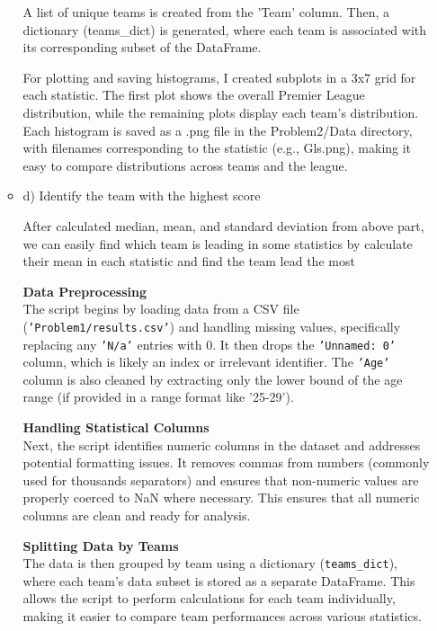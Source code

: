 \documentclass[a4paper,12pt]{article}
\begin{document}
\begin{itemize}[label= {*}, leftmargin= 1cm]
\begin{itemize}[label= {}, leftmargin= 1cm]
        A list of unique teams is created from the 'Team' column. Then, a dictionary (teams\_dict) is generated, where each team is associated with its corresponding subset of the DataFrame.

        For plotting and saving histograms, I created subplots in a 3x7 grid for each statistic. The first plot shows the overall Premier League distribution, while the remaining plots display each team's distribution. Each histogram is saved as a .png file in the Problem2/Data directory, with filenames corresponding to the statistic (e.g., Gls.png), making it easy to compare distributions across teams and the league.
        \vspace{0.8cm}
        
        
        \item d) Identify the team with the highest score
        \vspace{0.5cm}
        
        After calculated median, mean, and standard deviation from above part, we can easily find which team is leading in some statistics by calculate their mean in each statistic and find the team lead the most 
        \vspace{0.2cm}
        
        \textbf{Data Preprocessing}\\
        The script begins by loading data from a CSV file (\texttt{'Problem1/results.csv'}) and handling missing values, specifically replacing any \texttt{'N/a'} entries with 0. It then drops the \texttt{'Unnamed: 0'} column, which is likely an index or irrelevant identifier. The \texttt{'Age'} column is also cleaned by extracting only the lower bound of the age range (if provided in a range format like '25-29').
        \vspace{0.3cm}
        
        \textbf{Handling Statistical Columns}\\
        Next, the script identifies numeric columns in the dataset and addresses potential formatting issues. It removes commas from numbers (commonly used for thousands separators) and ensures that non-numeric values are properly coerced to NaN where necessary. This ensures that all numeric columns are clean and ready for analysis.
        \vspace{0.3cm}
        
        \textbf{Splitting Data by Teams}\\
        The data is then grouped by team using a dictionary (\texttt{teams\_dict}), where each team’s data subset is stored as a separate DataFrame. This allows the script to perform calculations for each team individually, making it easier to compare team performances across various statistics.
        \vspace{0.3cm}
        

\end{itemize}
\end{itemize}
\end{document}
